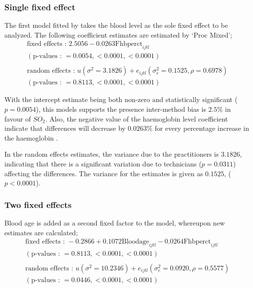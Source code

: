 \documentclass[12pt, a4paper]{report}
\begin{document}
\subsubsection{Single fixed effect} The first model fitted by \citet{LaiShiao} takes the
blood level as the sole fixed effect to be analyzed. The following
coefficient estimates are estimated by `Proc Mixed';
\begin{eqnarray}
\mbox{fixed effects :   } 2.5056 - 0.0263\mbox{Fhbperct}_{ijtl} \\
(\mbox{p-values :   } = 0.0054, <0.0001, <0.0001)\nonumber\\\nonumber\\
\mbox{random effects :   } u(\sigma^{2}=3.1826) + e_{ijtl}
(\sigma^{2}_{e}=0.1525, \rho= 0.6978) \nonumber\\
(\mbox{p-values :   } = 0.8113, <0.0001, <0.0001)\nonumber
\end{eqnarray}

With the intercept estimate being both non-zero and statistically
significant ($p=0.0054$), this models supports the presence
inter-method bias is $2.5\%$ in favour of $SO_{2}$. Also, the
negative value of the haemoglobin level coefficient indicate that
differences will decrease by $0.0263\%$ for every percentage
increase in the haemoglobin .

In the random effects estimates, the variance due to the
practitioners is $3.1826$, indicating that there is a significant
variation due to technicians ($p=0.0311$) affecting the
differences. The variance for the estimates is given as $0.1525$,
($p<0.0001$).

\subsubsection{Two fixed effects}
Blood age is added as a second fixed factor to the model,
whereupon new estimates are calculated;
\begin{eqnarray}
\mbox{fixed effects :   } -0.2866 + 0.1072 \mbox{Bloodage}_{ijtl}
- 0.0264\mbox{Fhbperct}_{ijtl}\nonumber\\
( \mbox{p-values :   } = 0.8113, <0.0001, <0.0001)\nonumber\\\nonumber\\
\mbox{random effects :   } u(\sigma^{2}=10.2346) + e_{ijtl}
(\sigma^{2}_{e}=0.0920, \rho= 0.5577) \nonumber\\
(\mbox{p-values :   } = 0.0446, <0.0001, <0.0001)
\end{eqnarray}
\end{document}
